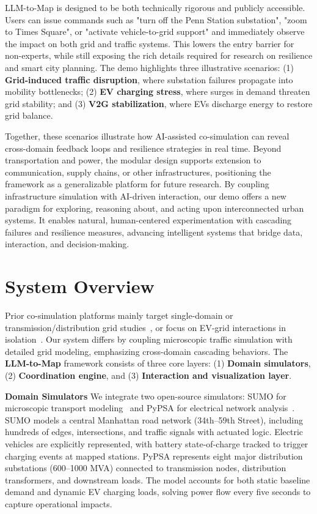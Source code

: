 \documentclass[sigconf,review,nonacm]{acmart}
\begin{document}
LLM-to-Map is designed to be both technically rigorous and publicly accessible. Users can issue commands such as "turn off the Penn Station substation", "zoom to Times Square", or "activate vehicle-to-grid support" and immediately observe the impact on both grid and traffic systems. This lowers the entry barrier for non-experts, while still exposing the rich details required for research on resilience and smart city planning.
The demo highlights three illustrative scenarios:
(1) \textbf{Grid-induced traffic disruption}, where substation failures propagate into mobility bottlenecks; (2) \textbf{EV charging stress}, where surges in demand threaten grid stability; and (3) \textbf{V2G stabilization}, where EVs discharge energy to restore grid balance.

Together, these scenarios illustrate how AI-assisted co-simulation can reveal cross-domain feedback loops and resilience strategies in real time. Beyond transportation and power, the modular design supports extension to communication, supply chains, or other infrastructures, positioning the framework as a generalizable platform for future research.
By coupling infrastructure simulation with AI-driven interaction, our demo offers a new paradigm for exploring, reasoning about, and acting upon interconnected urban systems. It enables natural, human-centered experimentation with cascading failures and resilience measures, advancing intelligent systems that bridge data, interaction, and decision-making.

\section{System Overview}
Prior co-simulation platforms mainly target single-domain or transmission/distribution grid studies~\cite{mihal2022smart}, or focus on EV-grid interactions in isolation~\cite{balogun2023ev,wallison2025electric}. Our system differs by coupling microscopic traffic simulation with detailed grid modeling, emphasizing cross-domain cascading behaviors.
The \textbf{LLM-to-Map} framework consists of three core layers: (1) \textbf{Domain simulators}, (2) \textbf{Coordination engine}, and (3) \textbf{Interaction and visualization layer}.

\noindent\textbf{Domain Simulators}
We integrate two open-source simulators: SUMO for microscopic transport modeling~\cite{lopez2018sumo} and PyPSA for electrical network analysis~\cite{brown2018pypsa}. SUMO models a central Manhattan road network (34th–59th Street), including hundreds of edges, intersections, and traffic signals with actuated logic. Electric vehicles are explicitly represented, with battery state-of-charge tracked to trigger charging events at mapped stations. PyPSA represents eight major distribution substations (600--1000 MVA) connected to transmission nodes, distribution transformers, and downstream loads. The model accounts for both static baseline demand and dynamic EV charging loads, solving power flow every five seconds to capture operational impacts.
\end{document}
